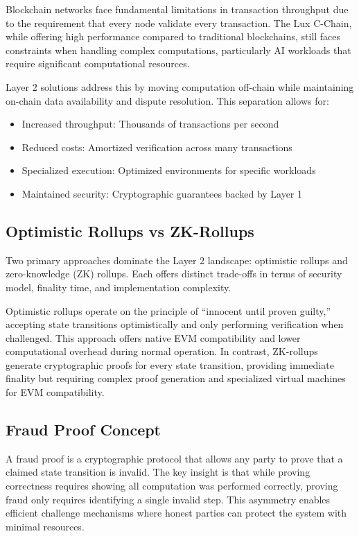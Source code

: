 \documentclass[11pt,a4paper]{article}
\theoremstyle{definition}
\begin{document}
Blockchain networks face fundamental limitations in transaction throughput due to the requirement that every node validate every transaction. The Lux C-Chain, while offering high performance compared to traditional blockchains, still faces constraints when handling complex computations, particularly AI workloads that require significant computational resources.

Layer 2 solutions address this by moving computation off-chain while maintaining on-chain data availability and dispute resolution. This separation allows for:
\begin{itemize}
    \item Increased throughput: Thousands of transactions per second
    \item Reduced costs: Amortized verification across many transactions
    \item Specialized execution: Optimized environments for specific workloads
    \item Maintained security: Cryptographic guarantees backed by Layer 1
\end{itemize}

\subsection{Optimistic Rollups vs ZK-Rollups}

Two primary approaches dominate the Layer 2 landscape: optimistic rollups and zero-knowledge (ZK) rollups. Each offers distinct trade-offs in terms of security model, finality time, and implementation complexity.

Optimistic rollups operate on the principle of ``innocent until proven guilty,'' accepting state transitions optimistically and only performing verification when challenged. This approach offers native EVM compatibility and lower computational overhead during normal operation. In contrast, ZK-rollups generate cryptographic proofs for every state transition, providing immediate finality but requiring complex proof generation and specialized virtual machines for EVM compatibility.

\subsection{Fraud Proof Concept}

A fraud proof is a cryptographic protocol that allows any party to prove that a claimed state transition is invalid. The key insight is that while proving correctness requires showing all computation was performed correctly, proving fraud only requires identifying a single invalid step. This asymmetry enables efficient challenge mechanisms where honest parties can protect the system with minimal resources.
\end{document}
